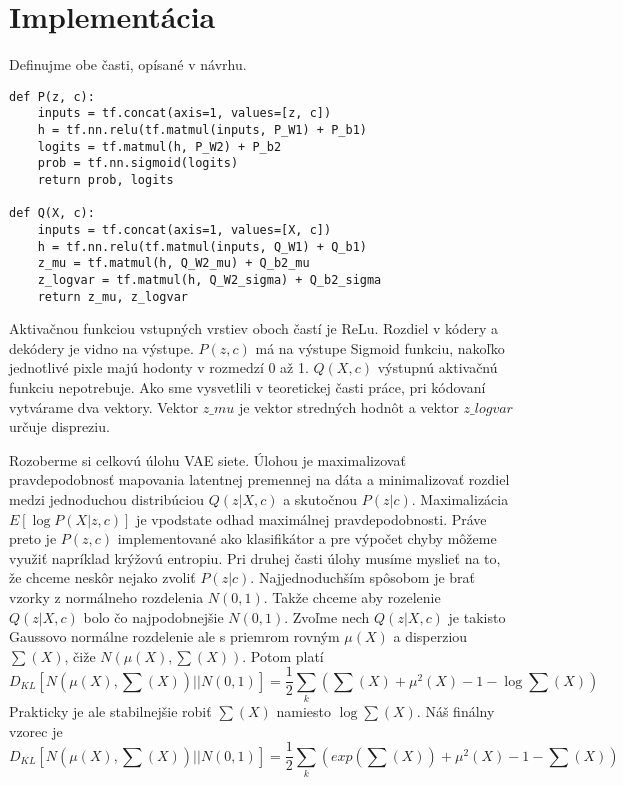 \section{Implementácia}
Definujme obe časti, opísané v návrhu.

\begin{verbatim}
def P(z, c):
    inputs = tf.concat(axis=1, values=[z, c])
    h = tf.nn.relu(tf.matmul(inputs, P_W1) + P_b1)
    logits = tf.matmul(h, P_W2) + P_b2
    prob = tf.nn.sigmoid(logits)
    return prob, logits

def Q(X, c):
    inputs = tf.concat(axis=1, values=[X, c])
    h = tf.nn.relu(tf.matmul(inputs, Q_W1) + Q_b1)
    z_mu = tf.matmul(h, Q_W2_mu) + Q_b2_mu
    z_logvar = tf.matmul(h, Q_W2_sigma) + Q_b2_sigma
    return z_mu, z_logvar
\end{verbatim}

Aktivačnou funkciou vstupných vrstiev oboch častí je ReLu.
Rozdiel v kódery a dekódery je vidno na výstupe.
\(P(z, c)\) má na výstupe Sigmoid funkciu, nakoľko jednotlivé pixle majú hodonty v rozmedzí 0 až 1.
\(Q(X, c)\) výstupnú aktivačnú funkciu nepotrebuje.
Ako sme vysvetlili v teoretickej časti práce, pri kódovaní vytvárame dva vektory.
Vektor \(z\_mu\) je vektor stredných hodnôt a vektor \(z\_logvar\) určuje dispreziu.

Rozoberme si celkovú úlohu VAE siete.
Úlohou je maximalizovať pravdepodobnosť mapovania latentnej premennej na dáta a minimalizovať rozdiel medzi jednoduchou distribúciou \(Q(z|X,c)\) a skutočnou \(P(z|c)\).
Maximalizácia \(E[\log P(X|z,c)]\) je vpodstate odhad maximálnej pravdepodobnosti.
Práve preto je \(P(z, c)\) implementované ako klasifikátor a pre výpočet chyby môžeme využiť napríklad krýžovú entropiu.
Pri druhej časti úlohy musíme myslieť na to, že chceme neskôr nejako zvoliť \(P(z|c)\).
Najjednoduchším spôsobom je brať vzorky z normálneho rozdelenia \(N(0,1)\).
Takže chceme aby rozelenie \(Q(z|X,c)\) bolo čo najpodobnejšie \(N(0,1)\).
Zvoľme nech \(Q(z|X,c)\) je takisto Gaussovo normálne rozdelenie ale s priemrom rovným \(\mu(X)\) a disperziou \(\sum (X)\), čiže \(N(\mu(X), \sum (X))\).
Potom platí \[D_{KL}[N(\mu(X), \sum (X))||N(0,1)] = \frac{1}{2}  \sum_{k} (\sum (X) + \mu^{2} (X) - 1 - \log \sum (X))\]
Prakticky je ale stabilnejšie robiť \(\sum (X)\) namiesto \(\log \sum (X)\).
Náš finálny vzorec je \[D_{KL}[N(\mu(X), \sum (X))||N(0,1)] = \frac{1}{2}  \sum_{k} (exp(\sum (X)) + \mu^{2} (X) - 1 - \sum (X))\]

